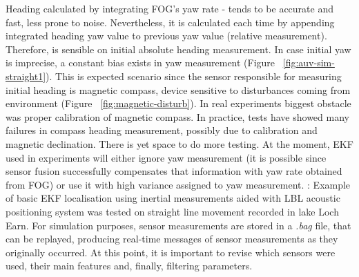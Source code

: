 Heading calculated by integrating FOG's yaw rate - tends to be accurate and fast, less prone to noise. Nevertheless, it is calculated each time by appending integrated heading yaw value to previous yaw value (relative measurement). Therefore, is sensible on initial absolute heading measurement. In case initial yaw is imprecise, a constant bias exists in yaw measurement (Figure ~\ref{fig:auv-sim-straight1}). This is expected scenario since the sensor responsible for measuring initial heading is magnetic compass, device sensitive to disturbances coming from environment (Figure ~\ref{fig:magnetic-disturb}). In real experiments biggest obstacle was proper calibration of magnetic compass. In practice, tests have showed many failures in compass heading measurement, possibly due to calibration and magnetic declination. There is yet space to do more testing. At the moment, EKF used in experiments will either ignore yaw measurement (it is possible since sensor fusion successfully compensates that information with yaw rate obtained from FOG) or use it with high variance assigned to yaw measurement. 
: Example of basic EKF localisation using inertial measurements aided with LBL acoustic positioning system was tested on straight line movement recorded in lake Loch Earn. For simulation purposes, sensor measurements are stored in a \textit{.bag} file, that can be replayed, producing real-time messages of sensor measurements as they originally occurred. At this point, it is important to revise which sensors were used, their main features and, finally, filtering parameters. 

